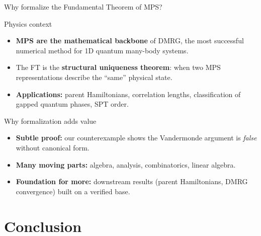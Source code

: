 \documentclass[aspectratio=169,10pt]{beamer}
\begin{document}
\begin{frame}{Why formalize the Fundamental Theorem of MPS?}
    \vspace{-0.6em}

    \begin{block}{Physics context}
        \begin{itemize}\itemsep0.1em
            \item \textbf{MPS are the mathematical backbone} of DMRG, the most successful
                  numerical method for 1D quantum many-body systems.
            \item The FT is the \textbf{structural uniqueness theorem}: when two
                  MPS representations describe the ``same'' physical state.
            \item \textbf{Applications:} parent Hamiltonians, correlation lengths,
                  classification of gapped quantum phases, SPT order.
        \end{itemize}
    \end{block}

    \begin{block}{Why formalization adds value}
        \begin{itemize}\itemsep0.1em
            \item \textbf{Subtle proof:} our counterexample shows
                  the Vandermonde argument is \emph{false} without canonical form.
            \item \textbf{Many moving parts:} algebra, analysis, combinatorics, linear algebra.
            \item \textbf{Foundation for more:} downstream results
                  (parent Hamiltonians, DMRG convergence) built on a verified base.
        \end{itemize}
    \end{block}
\end{frame}

\section{Conclusion}
\end{document}
